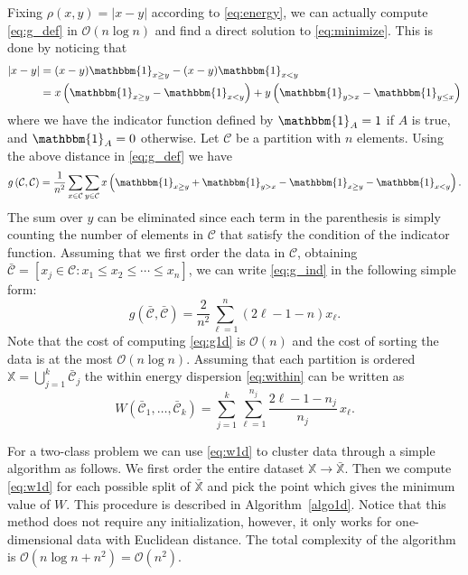 \documentclass[aps,preprint,nofootinbib,floatfix]{revtex4-1}
\newcommand\C{{\mathcal{C}}}
\newcommand\OO{{\mathcal{O}}}
\newcommand{\Ind}[1]{\mathbbm{1}_{#1}}
\begin{document}
Fixing
$\rho(x,y) = |x - y|$ according to \eqref{eq:energy}, we can actually compute 
\eqref{eq:g_def} in $\OO(n \log n)$ and find
a direct solution to \eqref{eq:minimize}. 
This is done by noticing that
\begin{equation}
\begin{aligned}
|x - y|  &= (x-y)\Ind{x \ge y} -
(x-y) \Ind{x < y}  \\
&= 
x \left( \Ind{x \ge y} - \Ind{x < y} \right)  + 
y \left( \Ind{y > x} - \Ind{y \le x} \right)  
\end{aligned}
\end{equation}
where we have the indicator function defined by 
$\Ind{A}=1$ if $A$ is true, and $\Ind{A}=0$ otherwise. 
Let $\C$ be a partition with
$n$ elements. Using the above distance in \eqref{eq:g_def} we have
\begin{equation}
\label{eq:g_ind}
g\left(\C,\C\right) = \dfrac{1}{n^2} \sum_{x \in \C} 
\sum_{y \in \C} 
x \left(
\Ind{x \ge y} + \Ind{y > x} - 
\Ind{x \ge y}-\Ind{x < y} \right) .
\end{equation}
The sum over $y$ can be eliminated since each term in
the parenthesis is simply counting the number of elements in $\C$ that satisfy
the condition of the indicator function. Assuming
that we first order the data in $\C$, obtaining
$\bar{\C} = [ x_j \in \C: x_1 \le x_2 \le \dotsm \le x_{n}]$, we
can write \eqref{eq:g_ind} in the following simple form:
\begin{equation}
\label{eq:g1d}
g\left(\bar{\C}, \bar{\C}\right) = 
\dfrac{2}{n^2} \sum_{\ell=1}^n (2\ell - 1 - n) x_\ell .
\end{equation}
Note that the cost of computing 
\eqref{eq:g1d}
is $\OO(n)$ and the cost of
sorting the data
is at the most $\OO(n\log n)$.
Assuming that each partition is ordered  $\mathbb{X} = \bigcup_{j=1}^k
\bar{\C}_j$ 
the within energy dispersion
\eqref{eq:within} can be written as
\begin{equation}
\label{eq:w1d}
W\left( \bar{\C}_1,\dotsc,\bar{\C}_k \right) = 
\sum_{j=1}^k \sum_{\ell=1}^{n_j} \dfrac{2\ell - 1 - n_j}{n_j} \, x_\ell.
\end{equation}

For a two-class problem we can use \eqref{eq:w1d} to cluster data
through a simple algorithm 
as follows. We first order
the entire dataset $\mathbb{X} \to \bar{\mathbb{X}}$. Then 
we compute \eqref{eq:w1d} for each possible split of $\bar{\mathbb{X}}$
and pick the point which gives the minimum value of $W$. 
This procedure is described in Algorithm~\ref{algo1d}. 
Notice that
this method does not require any initialization,
however,
it only works for one-dimensional data with Euclidean distance. The total
complexity of the algorithm is $\OO(n\log n + n^2) = \OO(n^2)$.
\end{document}
